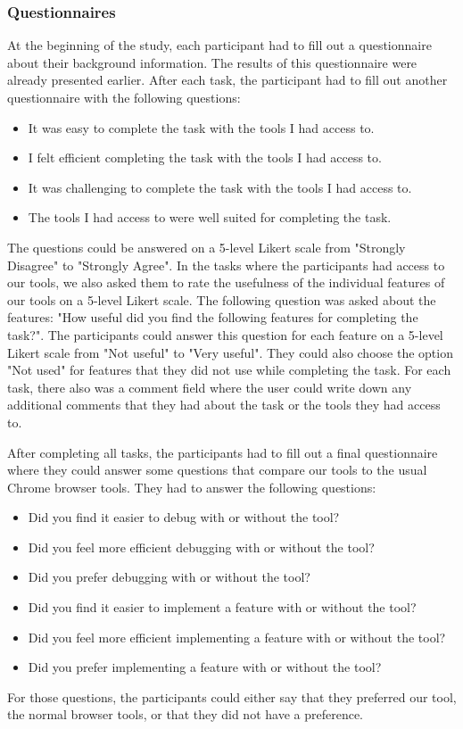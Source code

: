 \subsubsection{Questionnaires}
At the beginning of the study, each participant had to fill out a questionnaire about their background information. The results of this questionnaire were already presented earlier. After each task, the participant had to fill out another questionnaire with the following questions:
\begin{itemize}
	\item It was easy to complete the task with the tools I had access to.
	\item I felt efficient completing the task with the tools I had access to.
	\item It was challenging to complete the task with the tools I had access to.
	\item The tools I had access to were well suited for completing the task.
\end{itemize}
The questions could be answered on a 5-level Likert scale from "Strongly Disagree" to "Strongly Agree". In the tasks where the participants had access to our tools, we also asked them to rate the usefulness of the individual features of our tools on a 5-level Likert scale. The following question was asked about the features: "How useful did you find the following features for completing the task?". The participants could answer this question for each feature on a 5-level Likert scale from "Not useful" to "Very useful". They could also choose the option "Not used" for features that they did not use while completing the task. For each task, there also was a comment field where the user could write down any additional comments that they had about the task or the tools they had access to.

After completing all tasks, the participants had to fill out a final questionnaire where they could answer some questions that compare our tools to the usual Chrome browser tools. They had to answer the following questions:
\begin{itemize}
	\item Did you find it easier to debug with or without the tool?
	\item Did you feel more efficient debugging with or without the tool?
	\item Did you prefer debugging with or without the tool?
	\item Did you find it easier to implement a feature with or without the tool?
	\item Did you feel more efficient implementing a feature with or without the tool?
	\item Did you prefer implementing a feature with or without the tool?
\end{itemize}
For those questions, the participants could either say that they preferred our tool, the normal browser tools, or that they did not have a preference.

